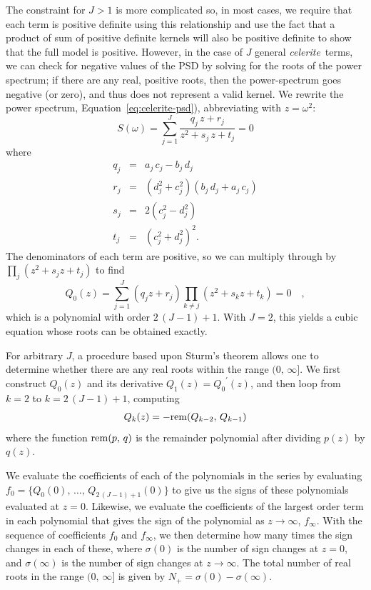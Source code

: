 \documentclass[manuscript, letterpaper]{aastex6}
\newcommand{\celeriteterm}{\emph{celerite}}
\renewcommand{\eqref}[1]{\ref{eq:#1}}
\newcommand{\eqalt}[1]{Equation~\eqref{#1}}
\newcommand{\response}[1]{{\color{blue}#1}}
\begin{document}
\response{The constraint for $J > 1$ is more complicated so, in most cases, we
require that each term is positive definite using this relationship and use
the fact that a product of sum of positive definite kernels will also be
positive definite \citep{Rasmussen:2006} to show that the full model is
positive.}
However, in the case of $J$ general \celeriteterm\ terms, we can check for
negative values of the PSD by solving for the roots of the power spectrum;
if there are any real, positive roots, then the power-spectrum goes negative
(or zero), and thus does not represent a valid kernel.
We rewrite the power spectrum, \eqalt{celerite-psd}), abbreviating with
$z = \omega^2$:
\begin{equation}
S(\omega)=  \sum_{j=1}^J \frac{q_j\,z + r_j}{z^2+s_j\,z + t_j} = 0
\end{equation}
where
\begin{eqnarray}
q_j &=& a_j\,c_j-b_j\,d_j\\
r_j &=& (d_j^2+c_j^2)(b_j\,d_j+a_j\,c_j)\\
s_j &=& 2(c_j^2-d_j^2)\\
t_j &=& (c_j^2+d_j^2)^2.
\end{eqnarray}
The denominators of each term are positive, so we can multiply through by
$\prod_j \left(z^2+s_jz + t_j\right)$ to find
\begin{equation}
Q_0(z) = \sum_{j=1}^J (q_j z + r_j)\prod_{k \ne j}\left(z^2+s_kz +
    t_k\right) = 0\quad,
\end{equation}
which is a polynomial with order $2\,(J-1)+1$.
With $J=2$, this yields a cubic equation whose roots can be obtained exactly.

For arbitrary $J$, a procedure based upon Sturm's theorem \citep{Dorrie:1965}
allows one to determine whether there are any real roots within the range
$(0,\,\infty]$.
We first construct $Q_0(z)$ and its derivative $Q_1(z) = {Q_0}^\prime(z)$,
and then loop from $k=2$ to $k=2\,(J-1)+1$, computing
\begin{eqnarray}
Q_k(z) = -{\rm rem}(Q_{k-2},\,Q_{k-1})
\end{eqnarray}
where the function ${\rm rem}(p,\,q)$ is the remainder polynomial after
dividing $p(z)$ by $q(z)$.

We evaluate the coefficients of each of the polynomials in the series by
evaluating $f_0 = \{Q_0(0),\,\ldots,\,Q_{2\,(J-1)+1}(0)\}$ to give us the signs
of these polynomials evaluated at $z=0$.
Likewise, we evaluate the coefficients of the largest order term in each
polynomial that gives the sign of the polynomial as $z \rightarrow \infty$,
$f_\infty$.
With the sequence of coefficients $f_0$ and $f_\infty$, we then determine how
many times the sign changes in each of these, where $\sigma(0)$ is the number
of sign changes at $z=0$, and $\sigma(\infty)$ is the number of sign changes
at $z \rightarrow \infty$.
The total number of real roots in the range
$(0,\,\infty]$ is given by $N_{+}=\sigma(0)-\sigma(\infty)$.
\end{document}
